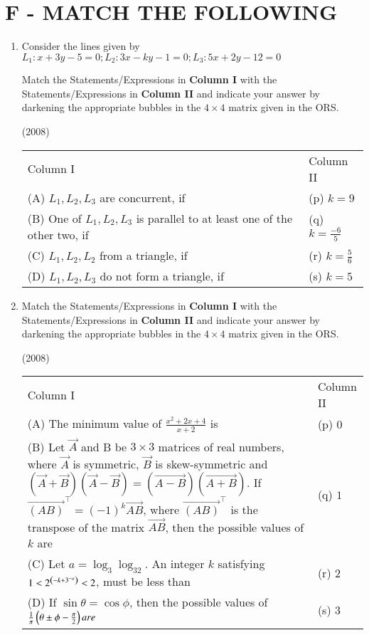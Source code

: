 \documentclass[journal,12pt,onecolumn]{IEEEtran}
\theoremstyle{remark}
\begin{document}
\section*{F - MATCH THE FOLLOWING}
\bigskip
\begin{enumerate}
	\item Consider the lines given by
		$L_1:x+3y-5=0; L_2:3x-ky-1=0; L_3:5x+2y-12=0$

		Match the Statements/Expressions in \textbf{Column I} with the Statements/Expressions in \textbf{Column II} and indicate your answer by darkening the appropriate bubbles in the $4\times4$ matrix given in the ORS.

		\hfill(2008)

		\begin{tabular}{p{12cm} p{3cm}}
			Column I & Column II \\
			(A) $L_1,L_2,L_3$ are concurrent, if & (p) $k=9$ \\
			(B) One of $L_1,L_2,L_3$ is parallel to at least one of the other two, if & (q) $k=\frac{-6}{5}$ \\
			(C) $L_1,L_2,L_2$ from a triangle, if & (r) $k=\frac{5}{6}$ \\
			(D) $L_1,L_2,L_3$ do not form a triangle, if & (s) $k=5$
		\end{tabular}


	\item  Match the Statements/Expressions in \textbf{Column I} with the Statements/Expressions in \textbf{Column II} and indicate your answer by darkening the appropriate bubbles in the $4\times4$ matrix given in the ORS.

		\hfill(2008)

		\begin{tabular}{p{12cm} p{3cm}}
			Column I & Column II \\
			(A) The minimum value of $\frac{x^2+2x+4}{x+2}$ is & (p) $0$ \\
			(B) Let $\vec{A}$ and B be $3\times3$ matrices of real numbers, where $\vec{A}$ is symmetric, $\vec{B}$ is skew-symmetric and $(\vec{A}+\vec{B})(\vec{A}-\vec{B})=(\vec{A-B})(\vec{A+B})$. If $\vec{(AB)}^\top=(-1)^k\vec{AB}$, where $\vec{(AB)}^\top$ is the transpose of the matrix $\vec{AB}$, then the possible values of $k$ are & (q) $1$ \\
			(C) Let $a=\log_3\log_32$. An integer $k$ satisfying $1<2^{\left(-k+3^{-a}\right)}<2$, must be less than & (r) $2$ \\
			(D) If $\sin\theta=\cos\phi$, then the possible values of $\frac{1}{\pi}\left(\theta\pm\phi-\frac{\pi}{2}\right) are $ & (s) $3$
		\end{tabular}
\end{enumerate}
\end{document}
